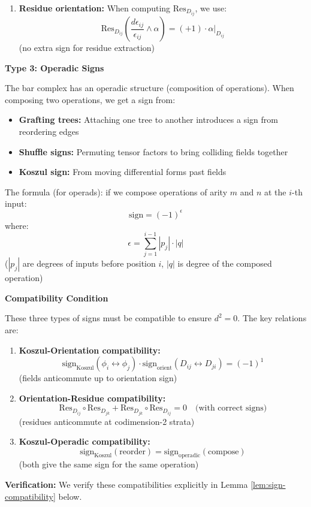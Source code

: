 \begin{convention}
\begin{enumerate}
\item \textbf{Residue orientation:} When computing $\text{Res}_{D_{ij}}$, we use:
$$\text{Res}_{D_{ij}}\left(\frac{d\epsilon_{ij}}{\epsilon_{ij}} \wedge \alpha\right) = (+1) \cdot \alpha|_{D_{ij}}$$
(no extra sign for residue extraction)
\end{enumerate}

\textbf{Type 3: Operadic Signs}

The bar complex has an operadic structure (composition of operations). When composing two operations, we get a sign from:

\begin{itemize}
\item \textbf{Grafting trees:} Attaching one tree to another introduces a sign from reordering edges
\item \textbf{Shuffle signs:} Permuting tensor factors to bring colliding fields together
\item \textbf{Koszul sign:} From moving differential forms past fields
\end{itemize}

The formula (for operads): if we compose operations of arity $m$ and $n$ at the $i$-th input:
$$\text{sign} = (-1)^{\epsilon}$$
where:
$$\epsilon = \sum_{j=1}^{i-1} |p_j| \cdot |q|$$
($|p_j|$ are degrees of inputs before position $i$, $|q|$ is degree of the composed operation)

\textbf{Compatibility Condition}

These three types of signs must be compatible to ensure $d^2 = 0$. The key relations are:

\begin{enumerate}
\item \textbf{Koszul-Orientation compatibility:}
$$\text{sign}_{\text{Koszul}}(\phi_i \leftrightarrow \phi_j) \cdot \text{sign}_{\text{orient}}(D_{ij} \leftrightarrow D_{ji}) = (-1)^{1}$$
(fields anticommute up to orientation sign)

\item \textbf{Orientation-Residue compatibility:}
$$\text{Res}_{D_{ij}} \circ \text{Res}_{D_{jk}} + \text{Res}_{D_{jk}} \circ \text{Res}_{D_{ij}} = 0 \quad \text{(with correct signs)}$$
(residues anticommute at codimension-2 strata)

\item \textbf{Koszul-Operadic compatibility:}
$$\text{sign}_{\text{Koszul}}(\text{reorder}) = \text{sign}_{\text{operadic}}(\text{compose})$$
(both give the same sign for the same operation)
\end{enumerate}

\textbf{Verification:} We verify these compatibilities explicitly in Lemma \ref{lem:sign-compatibility} below.
\end{convention}

